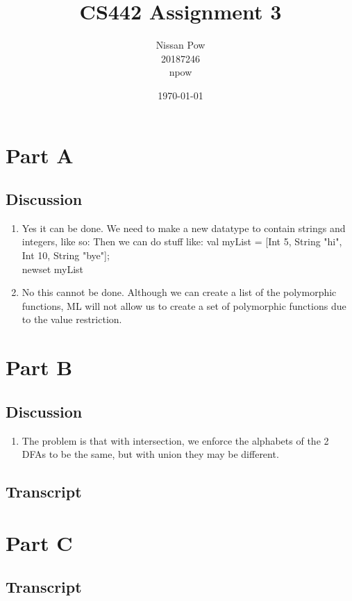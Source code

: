 \documentclass[onecolumn,11pt]{article}
\title{CS442 Assignment 3}
\author{Nissan Pow\\20187246\\npow}
\date{\today}
\begin{document}
\maketitle

\section*{Part A}

\subsection*{Discussion}
\begin{enumerate}
  \item{
    Yes it can be done. We need to make a new datatype to contain strings and integers, like so: 
    Then we can do stuff like: val myList = [Int 5, String "hi", Int 10, String "bye"]; \\
    newset myList
  }
  \item{No this cannot be done. Although we can create a list of the polymorphic functions, ML will not allow us to create a set of polymorphic functions due to the value restriction.}
\end{enumerate}

\section*{Part B}

\subsection*{Discussion}
\begin{enumerate}
  \item{The problem is that with intersection, we enforce the alphabets of the 2 DFAs to be the same, but with union they may be different. }
\end{enumerate}

\subsection*{Transcript}

\section*{Part C}

\subsection*{Transcript}
\end{document}
